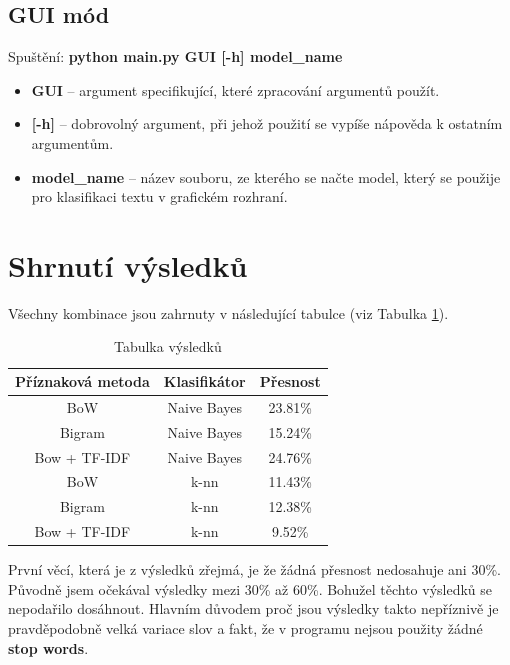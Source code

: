 \documentclass[12pt]{article}
\begin{document}
\subsection{GUI mód}
Spuštění: \textbf{python main.py GUI [-h] model\_name}
\begin{itemize}
	\item \textbf{GUI} -- argument specifikující, které zpracování argumentů
		použít.
	\item \textbf{[-h]} -- dobrovolný argument, při jehož použití se vypíše
		nápověda k ostatním argumentům.
	\item \textbf{model\_name} -- název souboru, ze kterého se načte model,
		který se použije pro klasifikaci textu v grafickém rozhraní.
\end{itemize}
%
%
\section{Shrnutí výsledků}
Všechny kombinace jsou zahrnuty v následující tabulce (viz Tabulka
\ref{tab:results}).

\begin{table}[H]
	\centering
        \begin{tabular}{| c | c | c |}
                \hline
                Příznaková metoda & Klasifikátor & Přesnost\\
                \hline
		BoW & Naive Bayes & 23.81\% \\
                \hline
                Bigram & Naive Bayes & 15.24\% \\
                \hline
                Bow + TF-IDF & Naive Bayes & 24.76\% \\
                \hline
                BoW & k-nn & 11.43\% \\
                \hline
                Bigram & k-nn & 12.38\% \\
                \hline
                Bow + TF-IDF & k-nn & 9.52\% \\
                \hline
        \end{tabular}
\caption{Tabulka výsledků}
\label{tab:results}
\end{table}
První věcí, která je z výsledků zřejmá, je že žádná přesnost
nedosahuje ani 30\%. Původně jsem očekával výsledky mezi 30\% 
až 60\%. Bohužel těchto výsledků se nepodařilo dosáhnout.
Hlavním důvodem proč jsou výsledky takto nepříznivě je pravděpodobně
velká variace slov a fakt, že v programu nejsou použity žádné 
\textbf{stop words}.
\end{document}
